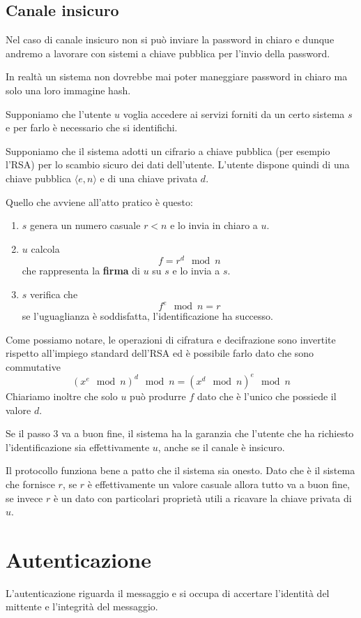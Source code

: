 \subsection{Canale insicuro}
Nel caso di canale insicuro non si pu\`o inviare la password in chiaro e dunque andremo a lavorare con sistemi a
chiave pubblica per l'invio della password.

In realt\`a un sistema non dovrebbe mai poter maneggiare password in chiaro ma solo una loro immagine hash.

Supponiamo che l'utente $u$ voglia accedere ai servizi forniti da un certo sistema $s$ e per farlo \`e necessario
che si identifichi.

Supponiamo che il sistema adotti un cifrario a chiave pubblica (per esempio l'RSA) per lo scambio sicuro dei dati
dell'utente. L'utente dispone quindi di una chiave pubblica $\langle e, n \rangle$ e di una chiave privata $d$.

Quello che avviene all'atto pratico \`e questo:
\begin{enumerate}
	\item $s$ genera un numero casuale $r < n$ e lo invia in chiaro a $u$.
	\item $u$ calcola
	      \[ f = r^d \mod{n} \]
	      che rappresenta la \textbf{firma} di $u$ su $s$ e lo invia a $s$.
	\item $s$ verifica che
	      \[ f^e \mod{n} = r \]
	      se l'uguaglianza \`e soddisfatta, l'identificazione ha successo.
\end{enumerate}
Come possiamo notare, le operazioni di cifratura e decifrazione sono invertite rispetto all'impiego standard dell'RSA
ed \`e possibile farlo dato che sono commutative
\[ (x^e \mod{n})^d \mod{n} = (x^d \mod{n})^e \mod{n} \]
Chiariamo inoltre che solo $u$ pu\`o produrre $f$ dato che \`e l'unico che possiede il valore $d$.

Se il passo 3 va a buon fine, il sistema ha la garanzia che l'utente che ha richiesto l'identificazione sia
effettivamente $u$, anche se il canale \`e insicuro.

Il protocollo funziona bene a patto che il sistema sia onesto. Dato che \`e il sistema che fornisce $r$, se $r$ \`e
effettivamente un valore casuale allora tutto va a buon fine, se invece $r$ \`e un dato con particolari propriet\`a
utili a ricavare la chiave privata di $u$.

\section{Autenticazione}
L'autenticazione riguarda il messaggio e si occupa di accertare l'identit\`a del mittente e l'integrit\`a del
messaggio.

